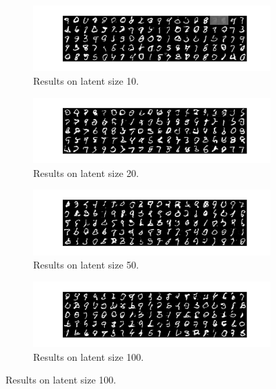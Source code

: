 \documentclass[12pt,letterpaper]{article}
\begin{document}
\begin{figure}[h]
    \begin{subfigure}{0.49\textwidth}
    \includegraphics[width=\linewidth]{WGAN_MNIST_0_10_256.png}
    \caption{\small Results on latent size 10.} \label{fig:a}
    \end{subfigure}\hspace*{\fill}
    \begin{subfigure}{0.49\textwidth}
    \includegraphics[width=\linewidth]{WGAN_MNIST_0_20_256.png}
    \caption{\small Results on latent size 20.} \label{fig:b}
    \end{subfigure}
    
    \medskip
    \begin{subfigure}{0.49\textwidth}
    \includegraphics[width=\linewidth]{WGAN_MNIST_0_50_256.png}
    \caption{\small Results on latent size 50.} \label{fig:c}
    \end{subfigure}\hspace*{\fill}
    \begin{subfigure}{0.49\textwidth}
    \includegraphics[width=\linewidth]{WGAN_MNIST_0_100_256.png}
    \caption{\small Results on latent size 100.} \label{fig:d}
    \end{subfigure}
    

\end{figure}
\end{document}
